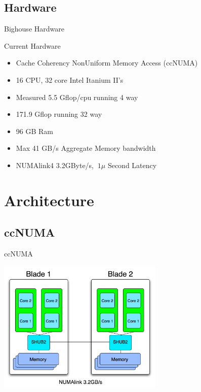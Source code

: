 \documentclass{beamer}
\begin{document}
  \subsection {Hardware}
  \begin{frame}{Bighouse Hardware}
   \begin{block}{Current Hardware}
   \begin{itemize}
    \item<1->Cache Coherency NonUniform Memory Access (ccNUMA)
    \item<2->16 CPU, 32 core Intel Itanium II's
    \item<3->Measured 5.5 Gflop/cpu running 4 way
    \item<3->171.9 Gflop running 32 way
    \item<4->96 GB Ram
    \item<5->Max 41 GB/s Aggregate Memory bandwidth
    \item<6->NUMAlink4 3.2GByte/s, $~1 \mu$ Second Latency
   \end{itemize}
   \end{block}
  \end{frame}

  \section{Architecture}
  \subsection{ccNUMA}
  \begin{frame}{ccNUMA}
   \begin{center}\includegraphics[height=2.5in]{numa}\end{center}
  \end{frame}
\end{document}
